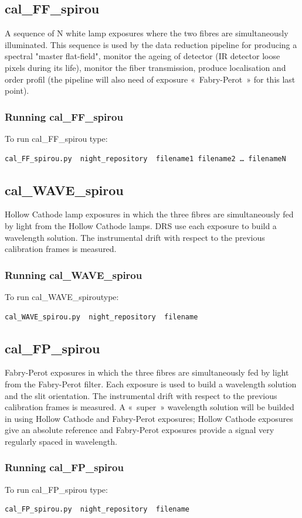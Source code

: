\subsection{cal\_FF\_spirou}

A sequence of N white lamp exposures where the two fibres are simultaneously illuminated. This sequence is used by the data reduction pipeline for producing a spectral "master flat-field", monitor the ageing of detector (IR detector loose pixels during its life), monitor the fiber transmission, produce localisation and order profil (the pipeline will also need of exposure « Fabry-Perot » for this last point).

\subsubsection{Running cal\_FF\_spirou}

To run cal\_FF\_spirou type:
\begin{lstlisting}[language=bash, style=bashstyle]
cal_FF_spirou.py  night_repository  filename1 filename2 … filenameN
\end{lstlisting}


\subsection{cal\_WAVE\_spirou}

Hollow Cathode lamp exposures in which the three fibres are simultaneously fed by light from the Hollow Cathode lamps. DRS use each exposure to build a wavelength solution. The instrumental drift with respect to the previous calibration frames is measured.

\subsubsection{Running cal\_WAVE\_spirou}

To run cal\_WAVE\_spiroutype:
\begin{lstlisting}[language=bash, style=bashstyle]
cal_WAVE_spirou.py  night_repository  filename
\end{lstlisting}



\subsection{cal\_FP\_spirou}

Fabry-Perot exposures in which the three fibres are simultaneously fed by light from the Fabry-Perot filter. Each exposure is used to build a wavelength solution and the slit orientation. The instrumental drift with respect to the previous calibration frames is measured. A « super » wavelength solution will be builded in using Hollow Cathode and Fabry-Perot exposures; Hollow Cathode exposures give an absolute reference and Fabry-Perot exposures provide a signal very regularly spaced  in wavelength.

\subsubsection{Running cal\_FP\_spirou}

To run cal\_FP\_spirou type:
\begin{lstlisting}[language=bash, style=bashstyle]
cal_FP_spirou.py  night_repository  filename
\end{lstlisting}
